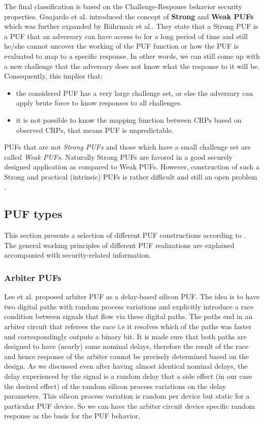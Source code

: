 The final classification is based on the Challenge-Response behavior security properties. Guajardo et al. \cite{11} introduced the concept of \textbf{Strong} and \textbf{Weak PUFs} which was further expanded by Rührmair et al.\cite{29}. They state that a Strong PUF is a PUF that an adversary can have access to for a long period of time and still he/she cannot uncover the working of the PUF function or how the PUF is evaluated to map to a specific response. In other words, we can still come up with a
new challenge that the adversary does not know what the response to it will be. Consequently, this implies that:
\begin{itemize}
	\item the considered PUF has a very large challenge set, or else the adversary can apply brute force to know responses to all challenges.
	\item it is not possible to know the mapping function between CRPs based on observed CRPs, that means PUF is unpredictable.
\end{itemize}
PUFs that are not \emph{Strong PUFs} and those which have a small challenge set are called \emph{Weak PUFs}. Naturally Strong PUFs are favored in a good securely designed application as compared to Weak PUFs. However, construction of such a Strong and practical (intrinsic) PUFs is rather difficult and still an open problem \cite{29}.\\

\subsection{PUF types}
This section presents a selection of different PUF constructions according to \cite{17}. The general working principles of different PUF realizations are explained accompanied with security-related information.

\subsubsection{Arbiter PUFs}
\label{arbiterpuf}

Lee et al.\cite{31} proposed arbiter PUF as a delay-based silicon PUF. The idea is to have two digital paths with random process variations and explicitly introduce a race condition between signals that flow via these digital paths. The paths end in an arbiter circuit that referees the race i.e it resolves which of the paths was faster and correspondingly outputs a binary bit. It is made sure that both paths are designed to have (nearly) same nominal delays, therefore the result of the race and hence
response of the arbiter cannot be precisely determined based on the design. As we discussed even after having almost identical nominal delays, the delay experienced by the signal is a random delay that a side effect (in our case the desired effect) of the random silicon process variations on the delay parameters. This silicon process variation is random per device but static for a particular PUF device. So we can have the arbiter circuit device specific random response as the basis for the PUF
behavior.\\

